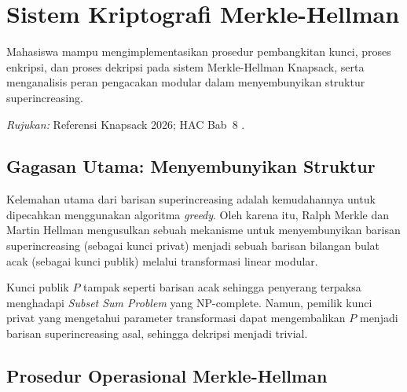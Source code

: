 \section{Sistem Kriptografi Merkle-Hellman}

\begin{subcpmk}
  \item Mahasiswa mampu mengimplementasikan prosedur pembangkitan kunci, proses enkripsi, dan proses dekripsi pada sistem Merkle-Hellman Knapsack, serta menganalisis peran pengacakan modular dalam menyembunyikan struktur superincreasing.
\end{subcpmk}

\noindent\textit{Rujukan:} Referensi Knapsack 2026; HAC Bab~8 \cite{hac_online}.

\subsection{Gagasan Utama: Menyembunyikan Struktur}

Kelemahan utama dari barisan superincreasing adalah kemudahannya untuk dipecahkan menggunakan algoritma \textit{greedy}. Oleh karena itu, Ralph Merkle dan Martin Hellman mengusulkan sebuah mekanisme untuk menyembunyikan barisan superincreasing (sebagai kunci privat) menjadi sebuah barisan bilangan bulat acak (sebagai kunci publik) melalui transformasi linear modular.

Kunci publik $P$ tampak seperti barisan acak sehingga penyerang terpaksa menghadapi \textit{Subset Sum Problem} yang NP-complete. Namun, pemilik kunci privat yang mengetahui parameter transformasi dapat mengembalikan $P$ menjadi barisan superincreasing asal, sehingga dekripsi menjadi trivial.

\subsection{Prosedur Operasional Merkle-Hellman}

